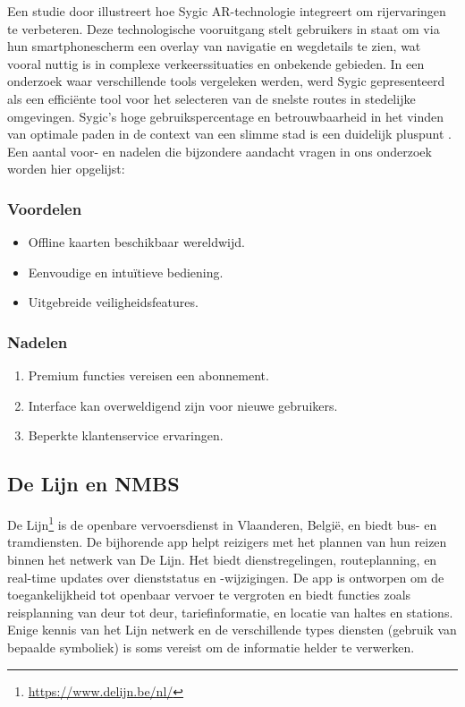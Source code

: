 Een studie door \textcite{Wnorowski2018} illustreert hoe Sygic AR-technologie integreert om rijervaringen te verbeteren. Deze technologische vooruitgang stelt gebruikers in staat om via hun smartphonescherm een overlay van navigatie en wegdetails te zien, wat vooral nuttig is in complexe verkeerssituaties en onbekende gebieden. In een onderzoek waar verschillende tools vergeleken werden, werd Sygic gepresenteerd als een efficiënte tool voor het selecteren van de snelste routes in stedelijke omgevingen. Sygic's hoge gebruikspercentage en betrouwbaarheid in het vinden van optimale paden in de context van een slimme stad is een duidelijk pluspunt \autocite{Putra2021}. Een aantal voor- en nadelen die bijzondere aandacht vragen in ons onderzoek worden hier opgelijst:

\subsubsection*{Voordelen}
\begin{itemize}
    \item Offline kaarten beschikbaar wereldwijd.
    \item Eenvoudige en intuïtieve bediening.
    \item Uitgebreide veiligheidsfeatures.
\end{itemize}
\subsubsection*{Nadelen}
\begin{enumerate}
    \item Premium functies vereisen een abonnement.
    \item Interface kan overweldigend zijn voor nieuwe gebruikers.
    \item Beperkte klantenservice ervaringen.
\end{enumerate}

\subsection{De Lijn en NMBS}
De Lijn\footnote{\url{https://www.delijn.be/nl/}} is de openbare vervoersdienst in Vlaanderen, België, en biedt bus- en tramdiensten. De bijhorende app helpt reizigers met het plannen van hun reizen binnen het netwerk van De Lijn. Het biedt dienstregelingen, routeplanning, en real-time updates over dienststatus en -wijzigingen. De app is ontworpen om de toegankelijkheid tot openbaar vervoer te vergroten en biedt functies zoals reisplanning van deur tot deur, tariefinformatie, en locatie van haltes en stations. Enige kennis van het Lijn netwerk en de verschillende types diensten (gebruik van bepaalde symboliek) is soms vereist om de informatie helder te verwerken.

